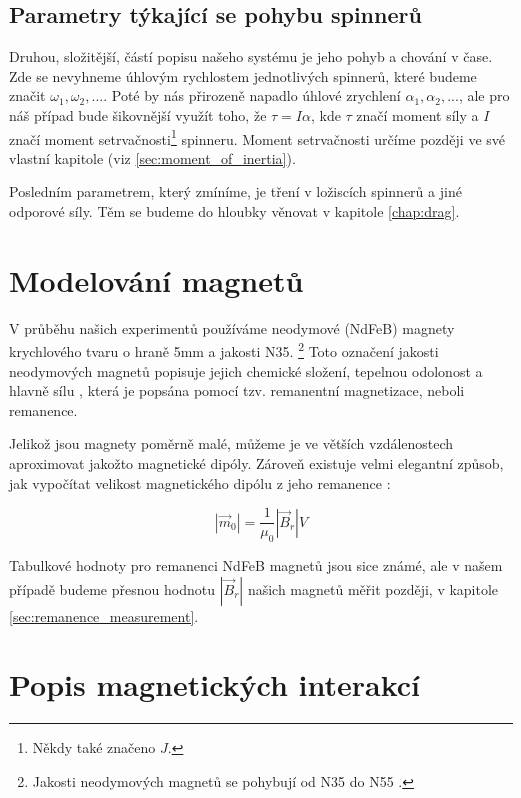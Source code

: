 \subsection{Parametry týkající se pohybu spinnerů}
\label{sub:param_move}

Druhou, složitější, částí popisu našeho systému je jeho pohyb a chování v čase.
Zde se nevyhneme úhlovým rychlostem jednotlivých spinnerů, které budeme značit $\omega_1, \omega_2,...$.
Poté by nás přirozeně napadlo úhlové zrychlení $\alpha_1, \alpha_2, ...$, ale pro náš případ bude šikovnější využít toho, že $\tau = I\alpha$, kde $\tau$ značí moment síly a $I$ značí moment setrvačnosti\footnote{Někdy také značeno $J$.} spinneru.
Moment setrvačnosti určíme později ve své vlastní kapitole (viz \autoref{sec:moment_of_inertia}).

Posledním parametrem, který zmíníme, je tření v ložiscích spinnerů a jiné odporové síly.
Těm se budeme do hloubky věnovat v kapitole \ref{chap:drag}.

\clearpage

\section{Modelování magnetů}
V průběhu našich experimentů používáme neodymové (NdFeB) magnety krychlového tvaru o hraně 5mm a jakosti N35. \footnote{Jakosti neodymových magnetů se pohybují od N35 do N55 \cite{magnet_grades}.}
Toto označení jakosti neodymových magnetů popisuje jejich chemické složení, tepelnou odolonost a hlavně sílu \cite{magnet_grades}, která je popsána pomocí tzv. remanentní magnetizace, neboli remanence.

Jelikož jsou magnety poměrně malé, můžeme je ve větších vzdálenostech aproximovat jakožto magnetické dipóly.
Zároveň existuje velmi elegantní způsob, jak vypočítat velikost magnetického dipólu z jeho remanence \cite{magnetic_torque}:

\begin{equation}
    \label{eq:mag_mom_remanence}
    |\vec{m}_0| = \frac{1}{\mu_0}|\vec{B}_r|V
\end{equation}

Tabulkové hodnoty pro remanenci NdFeB magnetů jsou sice známé, ale v našem případě budeme přesnou hodnotu $|\vec{B}_r|$ našich magnetů měřit později, v kapitole \ref{sec:remanence_measurement}.

\section{Popis magnetických interakcí}

